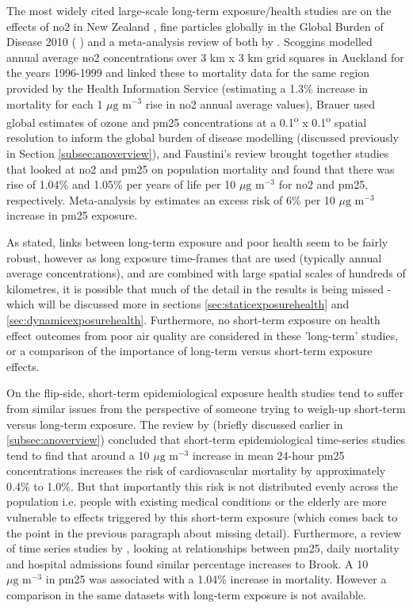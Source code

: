 The most widely cited large-scale long-term exposure/health studies are on the effects of \gls{no2} in New Zealand \cite{Scoggins2004}, fine particles globally in the Global Burden of Disease 2010 ( \cite{Brauer2012}) and a meta-analysis review of both by \cite{Faustini2014}. Scoggins modelled annual average \gls{no2} concentrations over 3 km x 3 km grid squares in Auckland for the years 1996-1999 and linked these to mortality data for the same region provided by the Health Information Service (estimating a 1.3\% increase in mortality for each 1 $\mu \text{g m}^{-3}$ rise in \gls{no2} annual average values), Brauer used global estimates of ozone and \gls{pm25} concentrations at a 0.1\textsuperscript{o} x 0.1\textsuperscript{o} spatial resolution  to inform the global burden of disease modelling (discussed previously in Section \ref{subsec:anoverview}), and Faustini's review brought together studies that looked at \gls{no2} and \gls{pm25} on population mortality and found that there was rise of 1.04\% and 1.05\% per years of life per 10 $\mu \text{g m}^{-3}$ for \gls{no2} and \gls{pm25}, respectively. Meta-analysis by \cite{Hoek2013} estimates an excess risk of 6\% per 10 $\mu \text{g m}^{-3}$ increase in \gls{pm25} exposure.

As stated, links between long-term exposure and poor health seem to be fairly robust, however as long exposure time-frames that are used (typically annual average concentrations), and are combined with large spatial scales of hundreds of kilometres, it is possible that much of the detail in the results is being missed - which will be discussed more in sections \ref{sec:staticexposurehealth} and \ref{sec:dynamicexposurehealth}. Furthermore, no short-term exposure on health effect outcomes from poor air quality are considered in these 'long-term' studies, or a comparison of the importance of long-term versus short-term exposure effects.

On the flip-side, short-term epidemiological exposure health studies tend to suffer from similar issues from the perspective of someone trying to weigh-up short-term versus long-term exposure. The review by \cite{Brook2010} (briefly discussed earlier in \ref{subsec:anoverview}) concluded that short-term epidemiological time-series studies tend to find that around a 10 $\mu \text{g m}^{-3}$ increase in mean 24-hour \gls{pm25} concentrations increases the risk of cardiovascular mortality by approximately 0.4\% to 1.0\%. But that importantly this risk is not distributed evenly across the population i.e. people with existing medical conditions or the elderly are more vulnerable to effects triggered by this short-term exposure (which comes back to the point in the previous paragraph about missing detail). Furthermore, a review of time series studies by \cite{Atkinson2014}, looking at relationships between \gls{pm25}, daily mortality and hospital admissions found similar percentage increases to Brook. A 10 $\mu \text{g m}^{-3}$ in \gls{pm25} was associated with a 1.04\% increase in mortality. However a comparison in the same datasets with long-term exposure is not available.

